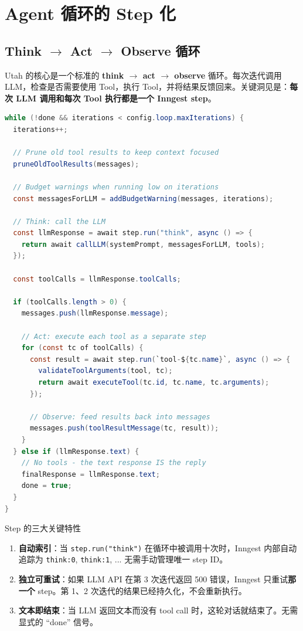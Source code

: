 \section{Agent 循环的 Step 化}

\subsection{Think $\to$ Act $\to$ Observe 循环}

Utah 的核心是一个标准的 \textbf{think $\to$ act $\to$ observe} 循环。每次迭代调用 LLM，检查是否需要使用 Tool，执行 Tool，并将结果反馈回来。关键洞见是：\textbf{每次 LLM 调用和每次 Tool 执行都是一个 Inngest step}。

\begin{lstlisting}[caption={Utah Agent 循环核心逻辑（简化版）},language=Java]
while (!done && iterations < config.loop.maxIterations) {
  iterations++;

  // Prune old tool results to keep context focused
  pruneOldToolResults(messages);

  // Budget warnings when running low on iterations
  const messagesForLLM = addBudgetWarning(messages, iterations);

  // Think: call the LLM
  const llmResponse = await step.run("think", async () => {
    return await callLLM(systemPrompt, messagesForLLM, tools);
  });

  const toolCalls = llmResponse.toolCalls;

  if (toolCalls.length > 0) {
    messages.push(llmResponse.message);

    // Act: execute each tool as a separate step
    for (const tc of toolCalls) {
      const result = await step.run(`tool-${tc.name}`, async () => {
        validateToolArguments(tool, tc);
        return await executeTool(tc.id, tc.name, tc.arguments);
      });

      // Observe: feed results back into messages
      messages.push(toolResultMessage(tc, result));
    }
  } else if (llmResponse.text) {
    // No tools - the text response IS the reply
    finalResponse = llmResponse.text;
    done = true;
  }
}
\end{lstlisting}

\begin{importantbox}{Step 的三大关键特性}
\begin{enumerate}
    \item \textbf{自动索引}：当 \texttt{step.run("think")} 在循环中被调用十次时，Inngest 内部自动追踪为 \texttt{think:0}, \texttt{think:1}, ... 无需手动管理唯一 step ID。
    \item \textbf{独立可重试}：如果 LLM API 在第 3 次迭代返回 500 错误，Inngest 只重试\textbf{那一个} step。第 1、2 次迭代的结果已经持久化，不会重新执行。
    \item \textbf{文本即结束}：当 LLM 返回文本而没有 tool call 时，这轮对话就结束了。无需显式的 ``done'' 信号。
\end{enumerate}
\end{importantbox}


